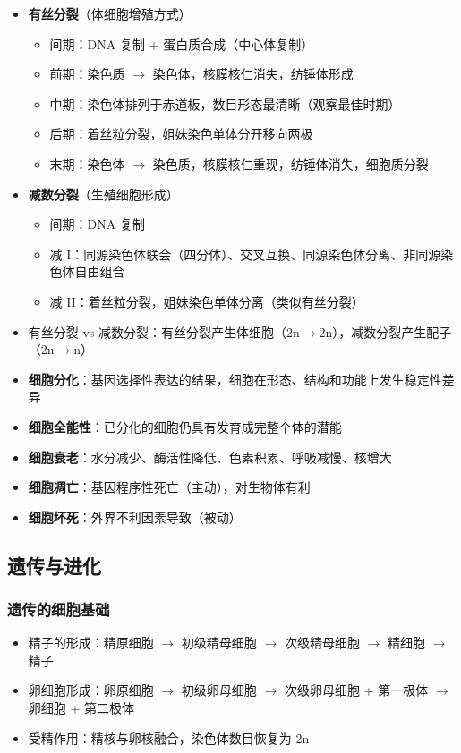 \begin{itemize}
  \item \textbf{有丝分裂}（体细胞增殖方式）
  \begin{itemize}
    \item 间期：DNA 复制 + 蛋白质合成（中心体复制）
    \item 前期：染色质 $\to$ 染色体，核膜核仁消失，纺锤体形成
    \item 中期：染色体排列于赤道板，数目形态最清晰（观察最佳时期）
    \item 后期：着丝粒分裂，姐妹染色单体分开移向两极
    \item 末期：染色体 $\to$ 染色质，核膜核仁重现，纺锤体消失，细胞质分裂
  \end{itemize}
  \item \textbf{减数分裂}（生殖细胞形成）
  \begin{itemize}
    \item 间期：DNA 复制
    \item 减 I：同源染色体联会（四分体）、交叉互换、同源染色体分离、非同源染色体自由组合
    \item 减 II：着丝粒分裂，姐妹染色单体分离（类似有丝分裂）
  \end{itemize}
  \item 有丝分裂 vs 减数分裂：有丝分裂产生体细胞（2n$\to$2n），减数分裂产生配子（2n$\to$n）
  \item \textbf{细胞分化}：基因选择性表达的结果，细胞在形态、结构和功能上发生稳定性差异
  \item \textbf{细胞全能性}：已分化的细胞仍具有发育成完整个体的潜能
  \item \textbf{细胞衰老}：水分减少、酶活性降低、色素积累、呼吸减慢、核增大
  \item \textbf{细胞凋亡}：基因程序性死亡（主动），对生物体有利
  \item \textbf{细胞坏死}：外界不利因素导致（被动）
\end{itemize}

\subsection{遗传与进化}

\subsubsection{遗传的细胞基础}

\begin{itemize}
  \item 精子的形成：精原细胞 $\to$ 初级精母细胞 $\to$ 次级精母细胞 $\to$ 精细胞 $\to$ 精子
  \item 卵细胞形成：卵原细胞 $\to$ 初级卵母细胞 $\to$ 次级卵母细胞 + 第一极体 $\to$ 卵细胞 + 第二极体
  \item 受精作用：精核与卵核融合，染色体数目恢复为 2n
\end{itemize}

